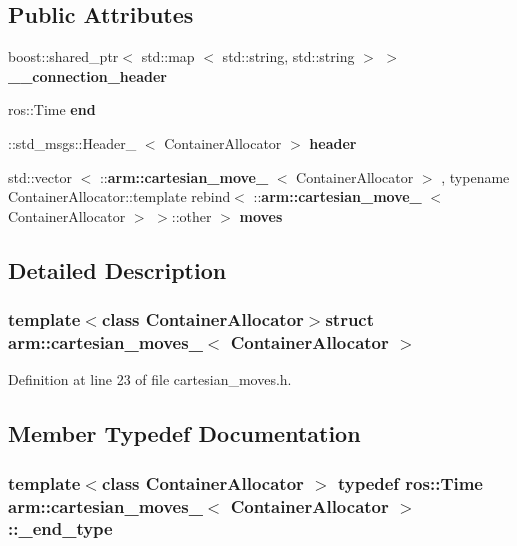 \subsection*{\-Public \-Attributes}
\begin{DoxyCompactItemize}
\item 
boost\-::shared\-\_\-ptr$<$ std\-::map\*
$<$ std\-::string, std\-::string $>$ $>$ {\bf \-\_\-\-\_\-connection\-\_\-header}
\item 
ros\-::\-Time {\bf end}
\item 
\-::std\-\_\-msgs\-::\-Header\-\_\-\*
$<$ \-Container\-Allocator $>$ {\bf header}
\item 
std\-::vector\*
$<$ \-::{\bf arm\-::cartesian\-\_\-move\-\_\-}\*
$<$ \-Container\-Allocator $>$\*
, typename \*
\-Container\-Allocator\-::template \*
rebind$<$ \-::{\bf arm\-::cartesian\-\_\-move\-\_\-}\*
$<$ \-Container\-Allocator $>$\*
 $>$\-::other $>$ {\bf moves}
\end{DoxyCompactItemize}


\subsection{\-Detailed \-Description}
\subsubsection*{template$<$class Container\-Allocator$>$struct arm\-::cartesian\-\_\-moves\-\_\-$<$ Container\-Allocator $>$}



\-Definition at line 23 of file cartesian\-\_\-moves.\-h.



\subsection{\-Member \-Typedef \-Documentation}
\subsubsection[{\-\_\-end\-\_\-type}]{\setlength{\rightskip}{0pt plus 5cm}template$<$class Container\-Allocator $>$ typedef ros\-::\-Time {\bf arm\-::cartesian\-\_\-moves\-\_\-}$<$ \-Container\-Allocator $>$\-::{\bf \-\_\-end\-\_\-type}}\label{structarm_1_1cartesian__moves___a6b20c7454e90bf479d35276d5c7d5e99}


